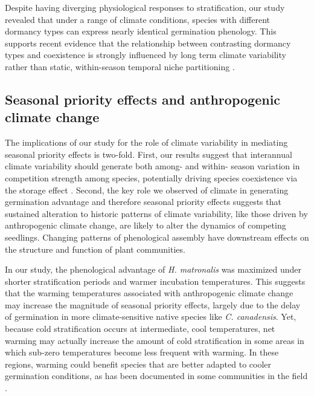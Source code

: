 \documentclass{article}[11pt]
\begin{document}

Despite having diverging physiological responses to stratification, our study revealed that under a range of climate conditions, species with different dormancy types can express nearly identical germination phenology. This supports recent evidence that the relationship between contrasting dormancy types and coexistence is strongly influenced by long term climate variability rather than static, within-season temporal niche partitioning \citep{Shriver:2017ud,CHESSON:1993vx}.

\subsection*{Seasonal priority effects and anthropogenic climate change}
The implications of our study for the role of climate variability in mediating seasonal priority effects is two-fold. First, our results suggest that interannual climate variability should generate both among- and within- season variation in competition strength among species, potentially driving species coexistence via the storage effect \citep{Chesson:2003ve}. Second, the key role we observed of climate in generating germination advantage and therefore seasonal priority effects suggests that sustained alteration to historic patterns of climate variability, like those driven by anthropogenic climate change, are likely to alter the dynamics of competing seedlings. Changing patterns of phenological assembly have downstream effects on the structure and function of plant communities.

In our study, the phenological advantage of \textit{H. matronalis} was maximized under shorter stratification periods and warmer incubation temperatures. This suggests that the warming temperatures associated with anthropogenic climate change may increase the magnitude of seasonal priority effects, largely due to the delay of germination in more climate-sensitive native species like \textit{C. canadensis}. Yet, because cold stratification occurs at intermediate, cool temperatures, net warming may actually increase the amount of cold stratification in some areas in which sub-zero temperatures become less frequent with warming. In these regions, warming could benefit species that are better adapted to cooler germination conditions, as has been documented in some communities in the field \citep{KIMBALL:2010vg}.
\end{document}
